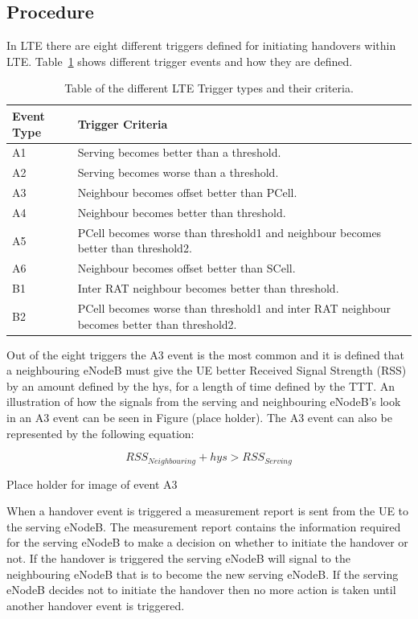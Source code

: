 \subsection{Procedure}\label{procedure}
In LTE there are eight different triggers defined for initiating handovers within LTE. Table~\ref{tab:trigger} shows different trigger events and how they are defined. 

\begin{table}[H]
  \begin{center}
    \begin{tabular}{| l | p{11.1cm} |}
  	  \hline
      Event Type & Trigger Criteria \\ \hline
      A1 & Serving becomes better than a threshold. \\
      A2 & Serving becomes worse than a threshold. \\
      A3 & Neighbour becomes offset better than \ac{PCell}. \\
      A4 & Neighbour becomes better than threshold. \\
      A5 & \ac{PCell} becomes worse than threshold1 and neighbour becomes better than threshold2. \\
      A6 & Neighbour becomes offset better than \ac{SCell}. \\
      B1 & Inter RAT neighbour becomes better than threshold. \\
      B2 & \ac{PCell} becomes worse than threshold1 and inter RAT neighbour becomes better than threshold2. \\
      \hline
  	\end{tabular}
  \end{center}
  \caption{Table of the different LTE Trigger types and their criteria.}
  \label{tab:trigger}
\end{table}

Out of the eight triggers the A3 event is the most common and it is defined that a neighbouring eNodeB must give the UE better Received Signal Strength (RSS) by an amount defined by the hys, for a length of time defined by the TTT.  An illustration of how the signals from the serving and neighbouring eNodeB’s look in an A3 event can be seen in Figure (place holder). The A3 event can also be represented by the following equation:

\begin{equation}
RSS_{Neighbouring} + hys > RSS_{Serving}
\end{equation}
 
Place holder for image of event A3

When a handover event is triggered a measurement report is sent from the UE to the serving eNodeB. The measurement report contains the information required for the serving eNodeB to make a decision on whether to initiate the handover or not. If the handover is triggered the serving eNodeB will signal to the neighbouring eNodeB that is to become the new serving eNodeB. If the serving eNodeB decides not to initiate the handover then no more action is taken until another handover event is triggered.
~\cite{3gpp2012triggers}